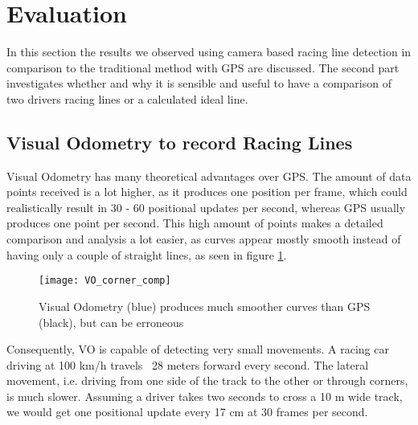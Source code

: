 \section{Evaluation}
\label{sec:evaluation}
In this section the results we observed using camera based racing line detection in comparison to the traditional method with GPS are discussed. The second part investigates whether and why it is sensible and useful to have a comparison of two drivers racing lines or a calculated ideal line.

\subsection{Visual Odometry to record Racing Lines}
Visual Odometry has many theoretical advantages over GPS. The amount of data points received is a lot higher, as it produces one position per frame, which could realistically result in 30 - 60 positional updates per second, whereas GPS usually produces one point per second. This high amount of points makes a detailed comparison and analysis a lot easier, as curves appear mostly smooth instead of having only a couple of straight lines, as seen in figure \ref{fig:vo_gps_comp}.

\begin{figure}[!ht]
	\centering
	\texttt{[image: VO\_corner\_comp]}
	\caption{Visual Odometry (blue) produces much smoother curves than GPS (black), but can be erroneous}
	\label{fig:vo_gps_comp}
\end{figure}

Consequently, VO is capable of detecting very small movements. A racing car driving at 100 km/h travels ~28 meters forward every second. The lateral movement, i.e. driving from one side of the track to the other or through corners, is much slower. Assuming a driver takes two seconds to cross a 10 m wide track, we would get one positional update every 17 cm at 30 frames per second. 

